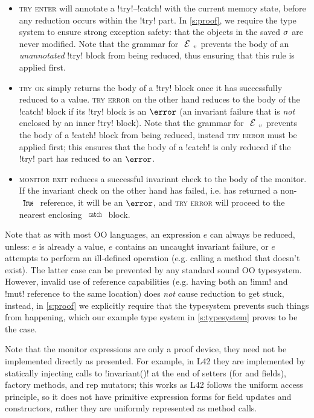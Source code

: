 \begin{itemize}
\item \textsc{try enter} will annotate a \Q!try!--\Q!catch! with the current memory state, before any reduction occurs within the \Q!try! part. In \autoref{s:proof}, we require the type system to ensure strong exception safety: that the objects in the saved $\sigma$ are never modified. Note that the grammar for $\EV$ prevents the body of an \emph{unannotated} \Q!try! block from being reduced, thus ensuring that this rule is applied first.

\item \textsc{try ok} simply returns the body of a \Q!try! block once it has successfully reduced to a value. \textsc{try error} on the other hand reduces to the body of the \Q!catch! block if its \Q!try! block is an $\error$ (an invariant failure that is \emph{not} enclosed by an inner \Q!try! block). Note that the grammar for $\EV$ prevents the body of a \Q!catch! block from being reduced, instead \textsc{try error} must be applied first; this ensures that the body of a \Q!catch! is only reduced if the \Q!try! part has reduced to an $\error$.

\item \textsc{monitor exit} reduces a successful invariant check to the body of the monitor. If the invariant check on the other hand has failed, i.e. has returned a non-$\Kw{True}$ reference, it will be an $\error$, and \textsc{try error} will proceed to the nearest enclosing $\Kw{catch}$ block.
\end{itemize}

Note that as with most OO languages, an expression $e$ can always be reduced, unless: $e$ is already a value, $e$ contains an uncaught invariant failure, or $e$ attempts to perform an ill-defined operation (e.g. calling a method that doesn't exist). The latter case can be prevented by any standard sound OO typesystem.
However, invalid use of reference capabilities (e.g. having both an \Q!imm! and \Q!mut! reference to the same location) does \emph{not} cause reduction to get stuck, instead, in \autoref{s:proof} we explicitly require that the typesystem prevents such things from happening, which our example type system in \autoref{s:typesystem} proves to be the case.

Note that the monitor expressions are only a proof device, they need not be implemented directly as presented.
For example, in L42 they are implemented by statically injecting calls to \Q!invariant()! at the end of setters (for \Q@imm@ and \Q@rep@ fields), factory methods, and rep mutators; this works as L42 follows the uniform access principle, so it does not have primitive expression forms for field updates and constructors, rather they are uniformly represented as method calls.


